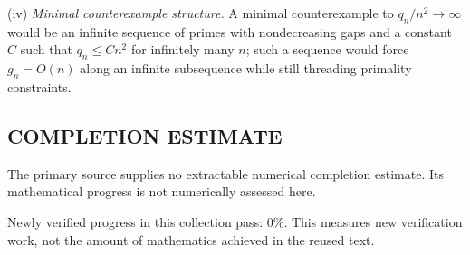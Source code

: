 (iv) \emph{Minimal counterexample structure.} A minimal counterexample to $q_n/n^2\to\infty$ would be an infinite sequence of primes with nondecreasing gaps and a constant $C$ such that $q_n\le C n^2$ for infinitely many $n$; such a sequence would force $g_n=O(n)$ along an infinite subsequence while still threading primality constraints.




\subsection*{COMPLETION ESTIMATE}
The primary source supplies no extractable numerical completion estimate. Its mathematical progress is not numerically assessed here.

Newly verified progress in this collection pass: $0\%$. This measures new verification work, not the amount of mathematics achieved in the reused text.
